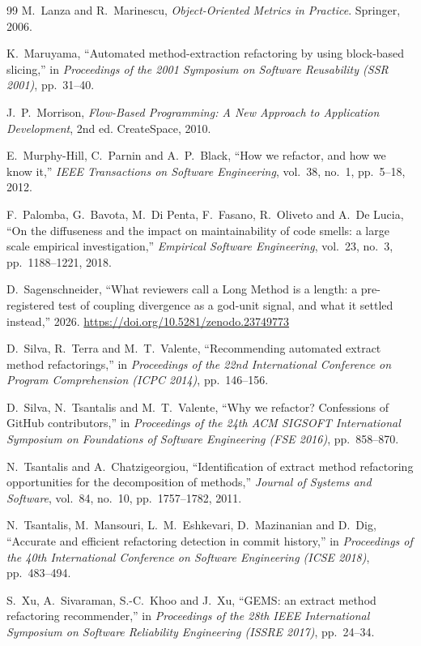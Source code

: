 \documentclass[11pt,a4paper]{article}
\begin{document}
\begin{thebibliography}{99}
 M.~Lanza and R.~Marinescu,
  \emph{Object-Oriented Metrics in Practice}. Springer, 2006.

 K.~Maruyama,
  ``Automated method-extraction refactoring by using block-based slicing,''
  in \emph{Proceedings of the 2001 Symposium on Software Reusability
  (SSR 2001)}, pp.~31--40.

 J.~P.~Morrison,
  \emph{Flow-Based Programming: A New Approach to Application Development},
  2nd ed. CreateSpace, 2010.

 E.~Murphy-Hill, C.~Parnin and A.~P.~Black,
  ``How we refactor, and how we know it,'' \emph{IEEE Transactions on
  Software Engineering}, vol.~38, no.~1, pp.~5--18, 2012.

 F.~Palomba, G.~Bavota, M.~Di Penta, F.~Fasano,
  R.~Oliveto and A.~De Lucia, ``On the diffuseness and the impact on
  maintainability of code smells: a large scale empirical investigation,''
  \emph{Empirical Software Engineering}, vol.~23, no.~3, pp.~1188--1221,
  2018.

 D.~Sagenschneider,
  ``What reviewers call a Long Method is a length: a pre-registered test of
  coupling divergence as a god-unit signal, and what it settled instead,''
  2026. \url{https://doi.org/10.5281/zenodo.23749773}

 D.~Silva, R.~Terra and M.~T.~Valente,
  ``Recommending automated extract method refactorings,'' in
  \emph{Proceedings of the 22nd International Conference on Program
  Comprehension (ICPC 2014)}, pp.~146--156.

 D.~Silva, N.~Tsantalis and M.~T.~Valente,
  ``Why we refactor? Confessions of GitHub contributors,'' in
  \emph{Proceedings of the 24th ACM SIGSOFT International Symposium on
  Foundations of Software Engineering (FSE 2016)}, pp.~858--870.

 N.~Tsantalis and A.~Chatzigeorgiou,
  ``Identification of extract method refactoring opportunities for the
  decomposition of methods,'' \emph{Journal of Systems and Software},
  vol.~84, no.~10, pp.~1757--1782, 2011.

 N.~Tsantalis, M.~Mansouri, L.~M.~Eshkevari,
  D.~Mazinanian and D.~Dig, ``Accurate and efficient refactoring detection
  in commit history,'' in \emph{Proceedings of the 40th International
  Conference on Software Engineering (ICSE 2018)}, pp.~483--494.

 S.~Xu, A.~Sivaraman, S.-C.~Khoo and J.~Xu,
  ``GEMS: an extract method refactoring recommender,'' in \emph{Proceedings
  of the 28th IEEE International Symposium on Software Reliability
  Engineering (ISSRE 2017)}, pp.~24--34.

\end{thebibliography}
\end{document}
